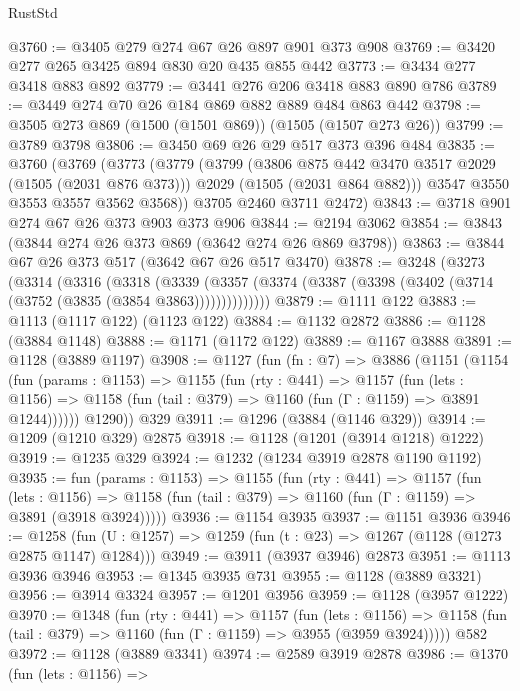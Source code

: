 \begin{lexlean}{RustStd}
\begin{coremodule}
@3760 := @3405 @279 @274 @67 @26 @897 @901 @373 @908
@3769 := @3420 @277 @265 @3425 @894 @830 @20 @435 @855 @442
@3773 := @3434 @277 @3418 @883 @892
@3779 := @3441 @276 @206 @3418 @883 @890 @786
@3789 := @3449 @274 @70 @26 @184 @869 @882 @889 @484 @863 @442
@3798 := @3505 @273 @869 (@1500 (@1501 @869)) (@1505 (@1507 @273 @26))
@3799 := @3789 @3798
@3806 := @3450 @69 @26 @29 @517 @373 @396 @484
@3835 := @3760
    (@3769
      (@3773
        (@3779
          (@3799
            (@3806 @875 @442 @3470 @3517 @2029 (@1505 (@2031 @876 @373)))
            @2029
            (@1505 (@2031 @864 @882)))
          @3547
          @3550
          @3553
          @3557
          @3562
          @3568))
      @3705
      @2460
      @3711
      @2472)
@3843 := @3718 @901 @274 @67 @26 @373 @903 @373 @906
@3844 := @2194 @3062
@3854 := @3843 (@3844 @274 @26 @373 @869 (@3642 @274 @26 @869 @3798))
@3863 := @3844 @67 @26 @373 @517 (@3642 @67 @26 @517 @3470)
@3878 := @3248
    (@3273
      (@3314
        (@3316
          (@3318
            (@3339
              (@3357 (@3374 (@3387 (@3398 (@3402 (@3714 (@3752 (@3835 (@3854 @3863))))))))))))))
@3879 := @1111 @122
@3883 := @1113 (@1117 @122) (@1123 @122)
@3884 := @1132 @2872
@3886 := @1128 (@3884 @1148)
@3888 := @1171 (@1172 @122)
@3889 := @1167 @3888
@3891 := @1128 (@3889 @1197)
@3908 := @1127
    (fun (fn : @7) =>
    @3886
      (@1151
        (@1154
          (fun (params : @1153) =>
          @1155
            (fun (rty : @441) =>
            @1157
              (fun (lets : @1156) =>
              @1158 (fun (tail : @379) => @1160 (fun (Γ : @1159) => @3891 @1244))))))
        @1290))
    @329
@3911 := @1296 (@3884 (@1146 @329))
@3914 := @1209 (@1210 @329) @2875
@3918 := @1128 (@1201 (@3914 @1218) @1222)
@3919 := @1235 @329
@3924 := @1232 (@1234 @3919 @2878 @1190 @1192)
@3935 := fun (params : @1153) =>
  @1155
    (fun (rty : @441) =>
    @1157
      (fun (lets : @1156) =>
      @1158 (fun (tail : @379) => @1160 (fun (Γ : @1159) => @3891 (@3918 @3924)))))
@3936 := @1154 @3935
@3937 := @1151 @3936
@3946 := @1258 (fun (U : @1257) => @1259 (fun (t : @23) => @1267 (@1128 (@1273 @2875 @1147) @1284)))
@3949 := @3911 (@3937 @3946) @2873
@3951 := @1113 @3936 @3946
@3953 := @1345 @3935 @731
@3955 := @1128 (@3889 @3321)
@3956 := @3914 @3324
@3957 := @1201 @3956
@3959 := @1128 (@3957 @1222)
@3970 := @1348
    (fun (rty : @441) =>
    @1157
      (fun (lets : @1156) =>
      @1158 (fun (tail : @379) => @1160 (fun (Γ : @1159) => @3955 (@3959 @3924)))))
    @582
@3972 := @1128 (@3889 @3341)
@3974 := @2589 @3919 @2878
@3986 := @1370
    (fun (lets : @1156) =>

\end{coremodule}
\end{lexlean}

